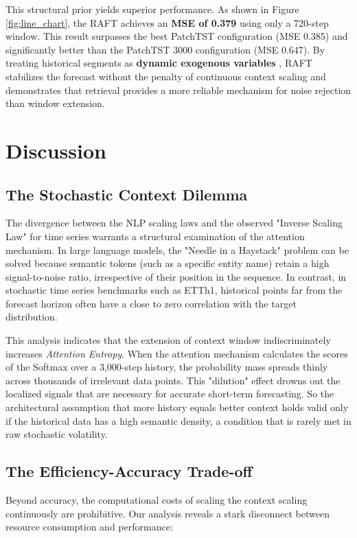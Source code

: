 \documentclass{article} %
\begin{document}
This structural prior yields superior performance. As shown in Figure \ref{fig:line_chart}, the RAFT achieves an \textbf{MSE of 0.379} using only a 720-step window. This result surpasses the best PatchTST configuration (MSE 0.385) and significantly better than the PatchTST 3000 configuration (MSE 0.647). By treating historical segments as \textbf{dynamic exogenous variables} \citep{arango2025chronosx}, RAFT stabilizes the forecast without the penalty of continuous context scaling and demonstrates that retrieval provides a more reliable mechanism for noise rejection than window extension.

\section{Discussion}

\subsection{The Stochastic Context Dilemma}
The divergence between the NLP scaling laws and the observed "Inverse Scaling Law" for time series warrants a structural examination of the attention mechanism. In large language models, the "Needle in a Haystack" problem can be solved because semantic tokens (such as a specific entity name) retain a high signal-to-noise ratio, irrespective of their position in the sequence. In contrast, in stochastic time series benchmarks such as ETTh1, historical points far from the forecast horizon often have a close to zero correlation with the target distribution.

This analysis indicates that the extension of context window indiscriminately increases \textit{Attention Entropy}. When the attention mechanism calculates the scores of the Softmax over a 3,000-step history, the probability mass spreads thinly across thousands of irrelevant data points. This "dilution" effect drowns out the localized signals that are necessary for accurate short-term forecasting. So the architectural assumption that more history equals better context holds valid only if the historical data has a high semantic density, a condition that is rarely met in raw stochastic volatility.

\subsection{The Efficiency-Accuracy Trade-off}
Beyond accuracy, the computational costs of scaling the context scaling continuously are prohibitive. Our analysis reveals a stark disconnect between resource consumption and performance:
\end{document}
